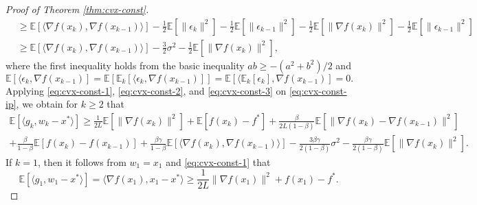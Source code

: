 \documentclass[10pt]{article}
\numberwithin{equation}{section}
\theoremstyle{definition}
\newcommand{\ebb}{\mathbb{E}}  %
\begin{document}
\begin{proof}[Proof of Theorem \ref{thm:cvx-const}]
\begin{equation}
\begin{aligned}
& \ge \ebb[\langle\nabla f(x_k), \nabla f(x_{k-1})\rangle]-\frac{1}{2}\ebb[\|\epsilon_k\|^2] -\frac{1}{2} \ebb[\|\epsilon_{k-1}\|^2]-\frac{1}{2}\ebb[\|\nabla f(x_k)\|^2]- \frac{1}{2}\ebb[\|\epsilon_{k-1}\|^2]\\
& \ge \ebb[\langle\nabla f(x_k), \nabla f(x_{k-1})\rangle]-\frac{3}{2} \sigma^2-\frac{1}{2} \ebb[\|\nabla f(x_k)\|^2],
\end{aligned}
\end{equation}
where the first inequality holds from the basic inequality $ab\ge -(a^2+b^2)/2$ and 
\[
\ebb[\langle\epsilon_k, \nabla f(x_{k-1})]=\ebb[\ebb_k[\langle\epsilon_k, \nabla f(x_{k-1})]]=\ebb[\langle\ebb_k[\epsilon_k], \nabla f(x_{k-1})]=0.
\]
Applying \eqref{eq:cvx-const-1}, \eqref{eq:cvx-const-2}, and \eqref{eq:cvx-const-3} on \eqref{eq:cvx-const-ip}, we obtain for $k\ge 2$ that
\begin{multline}\label{eq:cvx-const-ip2}
    \ebb[\langle g_k, w_k-x^*\rangle]\ge \frac{1}{2 L}\ebb[\|\nabla f(x_k)\|^2]+\ebb[f(x_k)-f^*] + \frac{\beta}{2L(1-\beta)}\ebb[\|\nabla f(x_k)-\nabla f(x_{k-1})\|^2] \\+ \frac{\beta}{1-\beta}\ebb[f(x_k)-f(x_{k-1})] + \frac{\beta\gamma}{1-\beta}\ebb[\langle\nabla f(x_k), \nabla f(x_{k-1})\rangle]-\frac{3\beta\gamma}{2(1-\beta)} \sigma^2-\frac{\beta\gamma}{2(1-\beta)} \ebb[\|\nabla f(x_k)\|^2].
\end{multline}
If $k=1$, then it follows from $w_1=x_1$ and \eqref{eq:cvx-const-1} that
\begin{equation}\label{eq:cvx-const-k=1}
    \ebb[\langle g_1, w_1-x^*\rangle] = \langle \nabla f(x_1), x_1-x^*\rangle\ge \frac{1}{2 L}\|\nabla f(x_1)\|^2+f(x_1)-f^*.
\end{equation}


\end{proof}
\end{document}
